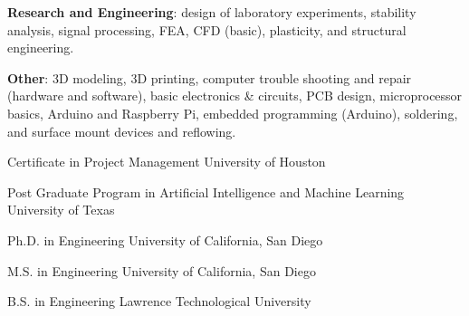 \documentclass{leresume}
\begin{document}
\begin{bulletedlist}
		\item \textbf{Research and Engineering}: design of laboratory experiments,
                        stability analysis,
                        signal processing,
                        FEA,
                        CFD (basic),
                        plasticity,
                        and structural engineering.
                        
		\item \textbf{Other}: 3D modeling,
                        3D printing,
                        computer trouble shooting and repair (hardware and software),
                        basic electronics \& circuits,
                        PCB design,
                        microprocessor basics,
                        Arduino and Raspberry Pi,
                        embedded programming (Arduino),
                        soldering,
                        and surface mount devices and reflowing.
                        
	\end{bulletedlist}

	
                {Certificate in Project Management}
                {University of Houston}
		
                {Post Graduate Program in Artificial Intelligence and Machine Learning}
                {University of Texas}
		
                {Ph.D. in Engineering}
                {University of California, San Diego}
		
                {M.S. in Engineering}
                {University of California, San Diego}
		
                {B.S. in Engineering}
                {Lawrence Technological University}
		

    
\end{document}
